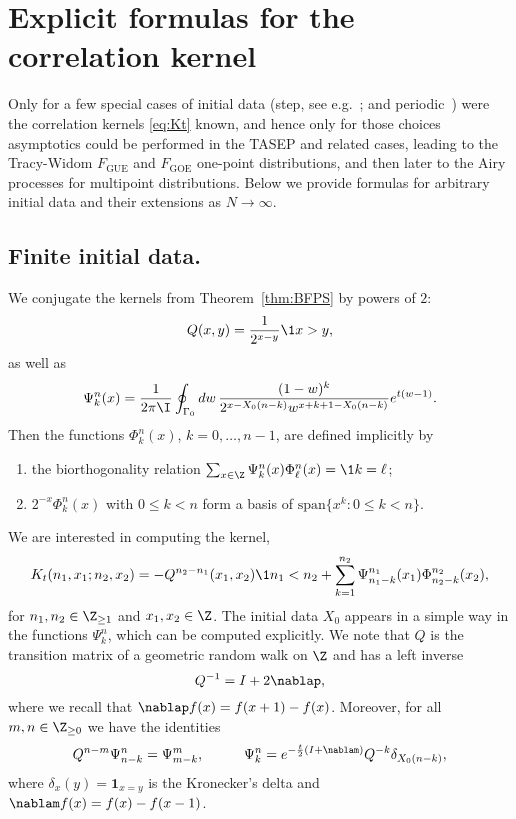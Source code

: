 \documentclass[]{pcmi}
\theoremstyle{plain}
\theoremstyle{definition}
\newcommand{\uno}[1]{\mathbf{1}_{#1}}
\begin{document}
\section{Explicit formulas for the correlation kernel}
\label{sec:exact}

Only for a few special cases of initial data (step, see e.g.~\cite{dimers}; and periodic~\cite{borFerPrahSasam,bfp,bfs}) were the correlation kernels \eqref{eq:Kt} known, and hence only for those choices asymptotics could be performed in the TASEP and related cases, leading to the Tracy-Widom $F_{\text{GUE}}$ and $F_{\text{GOE}}$ one-point distributions, and then later to the Airy processes for multipoint distributions. Below we provide formulas for arbitrary initial data and their extensions as $N \to \infty$.

\subsection{Finite initial data.}

We conjugate the kernels from Theorem~\ref{thm:BFPS} by powers of $2$: 
\begin{equation}\label{eq:defQ}
  Q(x,y)=\frac{1}{2^{x-y}}\1{x>y},
\end{equation}
as well as
\begin{equation}\label{eq:defPsi}
\Psi^n_k(x)=\frac1{2\pi\I}\oint_{\Gamma_0}dw\,\frac{(1-w)^k}{2^{x-X_0(n-k)}w^{x+k+1-X_0(n-k)}} e^{t(w-1)}.
\end{equation}
Then the functions $\Phi_k^{n}(x)$, $k=0,\ldots,n-1$, are defined implicitly by
\begin{enumerate}[label={\normalfont (\arabic{*})}]
\item the biorthogonality relation $\sum_{x\in\Z}\Psi_k^{n}(x)\Phi_\ell^{n}(x)=\1{k=\ell}$;
\label{ortho}
\smallskip
\item $2^{-x}\Phi^n_k(x)$ with $0 \leq k < n$ form a basis of ${\mathrm{span}}\bigl\{x^k : 0 \leq k < n\bigr\}$.
\end{enumerate} 
We are interested in computing the kernel,
\begin{equation}\label{eq:Kt_new}
K_t(n_1,x_1;n_2,x_2)=-Q^{n_2-n_1}(x_1,x_2)\1{n_1<n_2}+\sum_{k=1}^{n_2}\Psi^{n_1}_{n_1-k}(x_1)\Phi^{n_2}_{n_2-k}(x_2),
\end{equation}
for $n_1,n_2\in\Z_{\geq1}$ and $x_1,x_2\in\Z$. The initial data $X_0$ appears in a simple way in the functions $\Psi_k^n$, which can be computed explicitly. We note that $Q$ is the transition matrix of a geometric random walk on $\Z$ and has a left inverse 
\begin{equation}\label{eq:Qinv}
Q^{-1}=I+2\nablap, 
\end{equation}
where we recall that $\nablap f(x) = f(x+1) - f(x)$. Moreover, for all $m,n\in \Z_{\geq 0}$ we have the identities
\[ Q^{n-m}\Psi^n_{n-k}=\Psi^m_{m-k}, \hspace{1cm} \Psi^{n}_k=e^{-\frac{t}{2} (I+\nablam)}Q^{-k}\delta_{X_0(n-k)},\]
where $\delta_x(y) = \uno{x = y}$ is the Kronecker's delta and $\nablam f(x) = f(x) - f(x-1)$.
  
\end{document}
